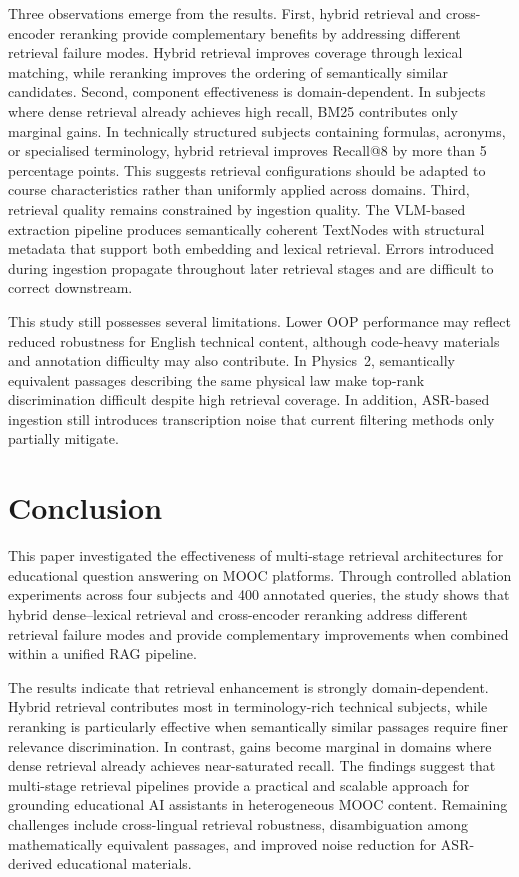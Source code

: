 \documentclass[runningheads]{llncs}
\begin{document}
Three observations emerge from the results. First, hybrid retrieval and cross-encoder reranking provide complementary benefits by addressing different retrieval failure modes. Hybrid retrieval improves coverage through lexical matching, while reranking improves the ordering of semantically similar candidates. Second, component effectiveness is domain-dependent. In subjects where dense retrieval already achieves high recall, BM25 contributes only marginal gains. In technically structured subjects containing formulas, acronyms, or specialised terminology, hybrid retrieval improves Recall@8 by more than 5 percentage points. This suggests retrieval configurations should be adapted to course characteristics rather than uniformly applied across domains. Third, retrieval quality remains constrained by ingestion quality. The VLM-based extraction pipeline produces semantically coherent TextNodes with structural metadata that support both embedding and lexical retrieval. Errors introduced during ingestion propagate throughout later retrieval stages and are difficult to correct downstream.

This study still possesses several limitations. Lower OOP performance may reflect reduced robustness for English technical content, although code-heavy materials and annotation difficulty may also contribute. In Physics~2, semantically equivalent passages describing the same physical law make top-rank discrimination difficult despite high retrieval coverage. In addition, ASR-based ingestion still introduces transcription noise that current filtering methods only partially mitigate.
\section{Conclusion}
\label{conclusion}

This paper investigated the effectiveness of multi-stage retrieval architectures for educational question answering on MOOC platforms. Through controlled ablation experiments across four subjects and 400 annotated queries, the study shows that hybrid dense--lexical retrieval and cross-encoder reranking address different retrieval failure modes and provide complementary improvements when combined within a unified RAG pipeline.

The results indicate that retrieval enhancement is strongly domain-dependent. Hybrid retrieval contributes most in terminology-rich technical subjects, while reranking is particularly effective when semantically similar passages require finer relevance discrimination. In contrast, gains become marginal in domains where dense retrieval already achieves near-saturated recall. The findings suggest that multi-stage retrieval pipelines provide a practical and scalable approach for grounding educational AI assistants in heterogeneous MOOC content. Remaining challenges include cross-lingual retrieval robustness, disambiguation among mathematically equivalent passages, and improved noise reduction for ASR-derived educational materials.
\end{document}
